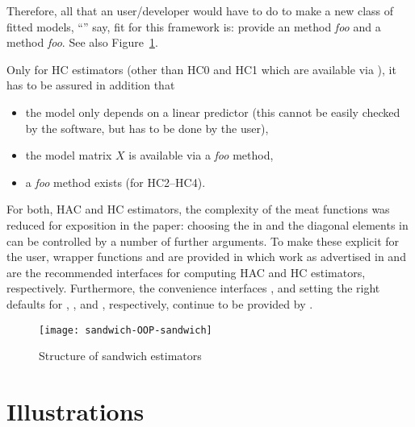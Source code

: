 \documentclass{Z}
\begin{document}
Therefore, all that an  user/developer would have to do to make a
new class of fitted models, ``'' say, fit for this framework is: 
provide an  method \emph{foo}\code{()}
and a  method \emph{foo}\code{()}.
See also Figure~\ref{fig:sandwich}.

Only for HC estimators (other than HC0 and HC1 which are available via ),
it has to be assured in addition that 
\begin{itemize}
  \item the model only depends on a linear predictor (this cannot be easily
        checked by the software, but has to be done by the user),
  \item the model matrix $X$ is available via a \emph{foo}\code{()} method,
  \item a \emph{foo}\code{()} method exists (for HC2--HC4).
\end{itemize}

For both, HAC and HC estimators, the complexity of the meat functions was reduced for
exposition in the paper: choosing the  in  and the diagonal elements
 in  can be controlled by a number of further arguments. To make
these explicit for the user, wrapper functions  and  are provided
in  which work as advertised in \cite{hac:Zeileis:2004a} and are the recommended
interfaces for computing HAC and HC estimators, respectively. Furthermore, the convenience
interfaces ,  and  setting the right defaults for
\citep{hac:Andrews:1991}, \cite{hac:Newey+West:1994}, and \cite{hac:Lumley+Heagerty:1999}, respectively,
continue to be provided by .

\begin{figure}[tbh]
\begin{center}
\texttt{[image: sandwich-OOP-sandwich]}
\caption{\label{fig:sandwich} Structure of sandwich estimators}
\end{center}
\end{figure}



\section{Illustrations} \label{sec:illustrations}
\end{document}
